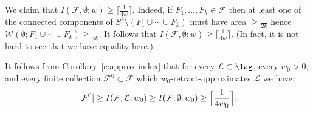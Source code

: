 We claim that
$I(\mathcal{F}, \emptyset; w) \geq \lceil \tfrac{1}{4w}
\rceil$. Indeed, if $F_1, \dots, F_k \in \mathcal{F}$ then at least
one of the connected components of
$S^2 \setminus (F_1 \cup \cdots \cup F_k)$ must have area
$\geq \tfrac{1}{2k}$ hence
$\mathcal{W}(\emptyset; F_1 \cup \cdots \cup F_k) \geq \tfrac{1}{4k}$.
It follows that
$I(\mathcal{F}, \emptyset; w) \geq \lceil \tfrac{1}{4w} \rceil$. (In
fact, it is not hard to see that we have equality here.)

It follows from Corollary~\ref{c:approx-index} that for every
$\mathcal{L} \subset \lag$, every $w_0>0$, and every finite collection
$\mathcal{F}^0 \subset \mathcal{F}$ which $w_0$-retract-approximates
$\mathcal{L}$ we have:
$$|\mathcal{F}^0| \geq I(\mathcal{F}, \mathcal{L}; w_0) \geq
I(\mathcal{F}, \emptyset; w_0) \geq \Bigl\lceil \frac{1}{4w_0} \Bigr
\rceil.$$
